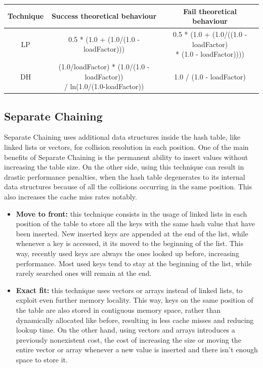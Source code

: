 \documentclass{article}
\begin{document}
\begin{tabular}{c|c|c}
    Technique & Success theoretical behaviour & Fail theoretical behaviour \\
\hline
    LP &  0.5 * (1.0 + (1.0/(1.0 - loadFactor))) & \makecell{0.5 * (1.0 + (1.0/((1.0 - loadFactor) \\ * (1.0 - loadFactor))))} \\
\hline
    DH & \makecell{(1.0/loadFactor) * (1.0/(1.0 - loadFactor)) \\ / ln(1.0/(1.0-loadFactor))} & 1.0 / (1.0 - loadFactor) \\
\end{tabular}

    \subsection{Separate Chaining}
    
    Separate Chaining uses additional data structures inside the hash table, like linked lists or vectors, for collision resolution in each position. One of the main benefits of Separate Chaining is the permanent ability to insert values without increasing the table size. On the other side, using this technique can result in drastic performance penalties, when the hash table degenerates to its internal data structures because of all the collisions occurring in the same position. This also increases the cache miss rates notably.
\begin{itemize}
    \item \textbf{Move to front:} this technique consists in the usage of linked lists in each position of the table to store all the keys with the same hash value that have been inserted. New inserted keys are appended at the end of the list, while whenever a key is accessed, it its moved to the beginning of the list. This way, recently used keys are always the ones looked up before, increasing performance. Most used keys tend to stay at the beginning of the list, while rarely searched ones will remain at the end.

    \item \textbf{Exact fit:} this technique uses vectors or arrays instead of linked lists, to exploit even further memory locality. This way, keys on the same position of the table are also stored in contiguous memory space, rather than dynamically allocated like before, resulting in less cache misses and reducing lookup time. On the other hand, using vectors and arrays introduces a previously nonexistent cost, the cost of increasing the size or moving the entire vector or array whenever a new value is inserted and there isn't enough space to store it.
\end{itemize}
\end{document}
